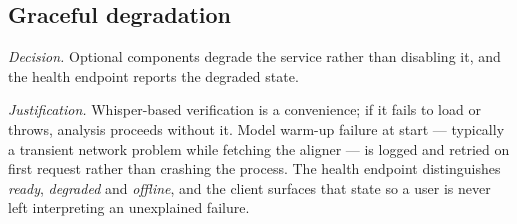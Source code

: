 \subsection{Graceful degradation}

\emph{Decision.} Optional components degrade the service rather than disabling
it, and the health endpoint reports the degraded state.

\emph{Justification.} Whisper-based verification is a convenience; if it fails
to load or throws, analysis proceeds without it. Model warm-up failure at start
--- typically a transient network problem while fetching the aligner --- is
logged and retried on first request rather than crashing the process. The
health endpoint distinguishes \emph{ready}, \emph{degraded} and \emph{offline},
and the client surfaces that state so a user is never left interpreting an
unexplained failure.

